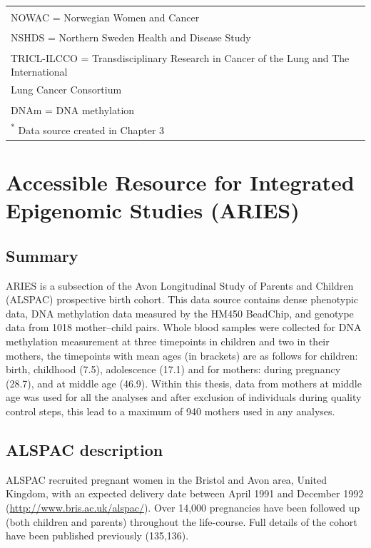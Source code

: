 \documentclass[11pt,oneside]{bristolthesis}
\begin{document}
\begin{table}[!h]
{\begin{tabular}[t]{llll}
\multicolumn{4}{l}{\textsuperscript{} NOWAC = Norwegian Women and Cancer}\\
\multicolumn{4}{l}{\textsuperscript{} NSHDS = Northern Sweden Health and Disease Study}\\
\multicolumn{4}{l}{\textsuperscript{} TRICL-ILCCO = Transdisciplinary Research in Cancer of the Lung and The International}\\
\multicolumn{4}{l}{Lung Cancer Consortium}\\
\multicolumn{4}{l}{\textsuperscript{} DNAm = DNA methylation}\\
\multicolumn{4}{l}{\textsuperscript{*} Data source created in Chapter 3}\\
\end{tabular}}
\end{table}
\hypertarget{aries-02}{%
\section{Accessible Resource for Integrated Epigenomic Studies (ARIES)}\label{aries-02}}

\hypertarget{aries-summary}{%
\subsection{Summary}\label{aries-summary}}

ARIES is a subsection of the Avon Longitudinal Study of Parents and Children (ALSPAC) prospective birth cohort. This data source contains dense phenotypic data, DNA methylation data measured by the HM450 BeadChip, and genotype data from 1018 mother--child pairs. Whole blood samples were collected for DNA methylation measurement at three timepoints in children and two in their mothers, the timepoints with mean ages (in brackets) are as follows for children: birth, childhood (7.5), adolescence (17.1) and for mothers: during pregnancy (28.7), and at middle age (46.9). Within this thesis, data from mothers at middle age was used for all the analyses and after exclusion of individuals during quality control steps, this lead to a maximum of 940 mothers used in any analyses.

\hypertarget{alspac-description-02}{%
\subsection{ALSPAC description}\label{alspac-description-02}}

ALSPAC recruited pregnant women in the Bristol and Avon area, United Kingdom, with an expected delivery date between April 1991 and December 1992 (\url{http://www.bris.ac.uk/alspac/}). Over 14,000 pregnancies have been followed up (both children and parents) throughout the life-course. Full details of the cohort have been published previously (135,136).
\end{document}
